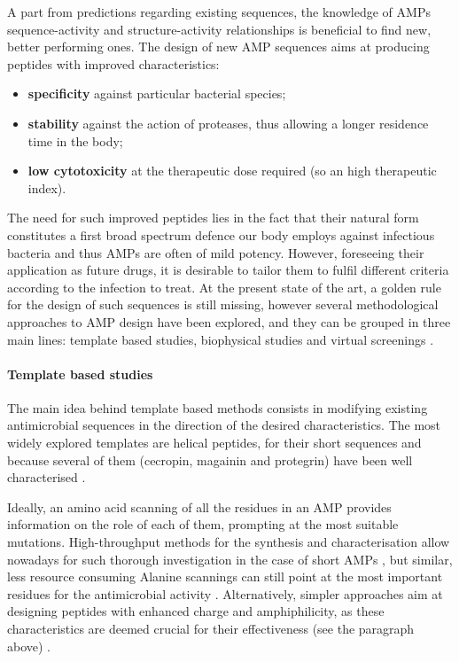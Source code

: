 A part from predictions regarding existing sequences, the knowledge of AMPs sequence-activity and structure-activity relationships is beneficial to find new, better performing ones. The design of new AMP sequences aims at producing peptides with improved characteristics:
\begin{itemize}
\item \textbf{specificity} against particular bacterial species;
\item \textbf{stability} against the action of proteases, thus allowing a longer residence time in the body;
\item \textbf{low cytotoxicity} at the therapeutic dose required (so an high therapeutic index).
\end{itemize}
The need for such improved peptides lies in the fact that their natural form constitutes a first broad spectrum defence our body employs against infectious bacteria and thus AMPs are often of mild potency. However, foreseeing their application as future drugs, it is desirable to tailor them to fulfil different criteria according to the infection to treat.
%
At the present state of the art, a golden rule for the design of such sequences is still missing, however several methodological approaches to AMP design have been explored, and they can be grouped in three main lines: template based studies, biophysical studies and virtual screenings \citep{Fjell2011}.

\paragraph{Template based studies}
The main idea behind template based methods consists in modifying existing antimicrobial sequences in the direction of the desired characteristics. The most widely explored templates are helical peptides, for their short sequences and because several of them (cecropin, magainin and protegrin) have been well characterised \citep{Wang2015}.

Ideally, an amino acid scanning of all the residues in an AMP provides information on the role of each of them, prompting at the most suitable mutations. High-throughput methods for the synthesis and characterisation allow nowadays for such thorough investigation in the case of short AMPs \citep{Hilpert2005}, but similar, less resource consuming Alanine scannings can still point at the most important residues for the antimicrobial activity \citep{Migon2018}.
%
Alternatively, simpler approaches aim at designing peptides with enhanced charge and amphiphilicity, as these characteristics are deemed crucial for their effectiveness (see the paragraph above) \citep{Wang2015}.

